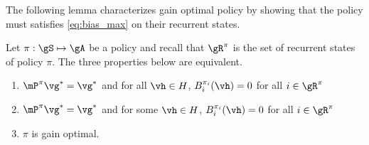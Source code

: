 The following lemma characterizes gain optimal policy by showing that the policy must satisfies \eqref{eq:bias_max} on their recurrent states.
\begin{lem}
    \label{lem:opt_pol}
    Let $\pi:\gS\mapsto\gA$ be a policy and recall that $\gR^\pi$ is the set of recurrent states of policy $\pi$.
    The three properties below are equivalent.
    \begin{enumerate}[label=(\roman*)]
        \item \label{it:opt_pol1} $\mP^\pi\vg^*=\vg^*$ and for all $\vh\in H$, $B^{\pi_i}_i(\vh)=0$ for all $i\in\gR^\pi$
        \item \label{it:opt_pol2} $\mP^\pi\vg^*=\vg^*$ and for some $\vh\in H$, $B^{\pi_i}_i(\vh)=0$ for all $i\in\gR^\pi$
        \item \label{it:opt_pol3} $\pi$ is gain optimal.
    \end{enumerate}
\end{lem}
